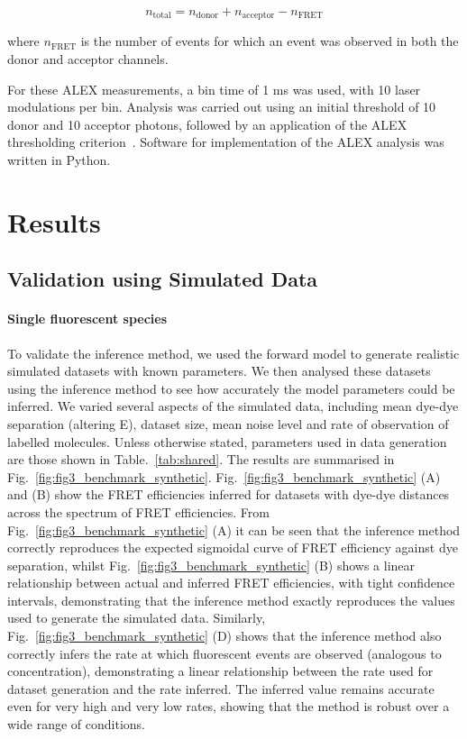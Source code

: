 \begin{equation}
n_{\text{total}} = n_{\text{donor}} + n_{\text{acceptor}} - n_{\text{FRET}}
\label{eq:total_events}
\end{equation}

where $n_{\text{FRET}}$ is the number of events for which an event was observed in both the donor and acceptor channels. 

For these ALEX measurements, a bin time of 1 ms was used, with 10 laser modulations per bin. Analysis was carried out using an initial threshold of 10 donor and 10 acceptor photons, followed by an application of the ALEX thresholding criterion~\cite{kapanidis05}. Software for implementation of the ALEX analysis was written in Python.


\section{Results}
\subsection{Validation using Simulated Data}
\paragraph*{Single fluorescent species}


To validate the inference method, we used the forward model to generate realistic simulated datasets with known parameters.  We then analysed these datasets using the inference method to see how accurately the model parameters could be inferred. We varied several aspects of the simulated data, including mean dye-dye separation (altering E), dataset size, mean noise level and rate of observation of labelled molecules.  Unless otherwise stated, parameters used in data generation are those shown in Table.~\ref{tab:shared}. The results are summarised in Fig.~\ref{fig:fig3_benchmark_synthetic}.  Fig.~\ref{fig:fig3_benchmark_synthetic} (A) and (B) show the FRET efficiencies inferred for datasets with dye-dye distances across the spectrum of FRET efficiencies.  From Fig.~\ref{fig:fig3_benchmark_synthetic} (A) it can be seen that the inference method correctly reproduces the expected sigmoidal curve of FRET efficiency against dye separation, whilst Fig.~\ref{fig:fig3_benchmark_synthetic} (B) shows a linear relationship between actual and inferred FRET efficiencies, with tight confidence intervals, demonstrating that the inference method exactly reproduces the values used to generate the simulated data.  Similarly, Fig.~\ref{fig:fig3_benchmark_synthetic} (D) shows that the inference method also correctly infers the rate at which fluorescent events are observed (analogous to concentration), demonstrating a linear relationship between the rate used for dataset generation and the rate inferred.  The inferred value remains accurate even for very high and very low rates, showing that the method is robust over a wide range of conditions. 

